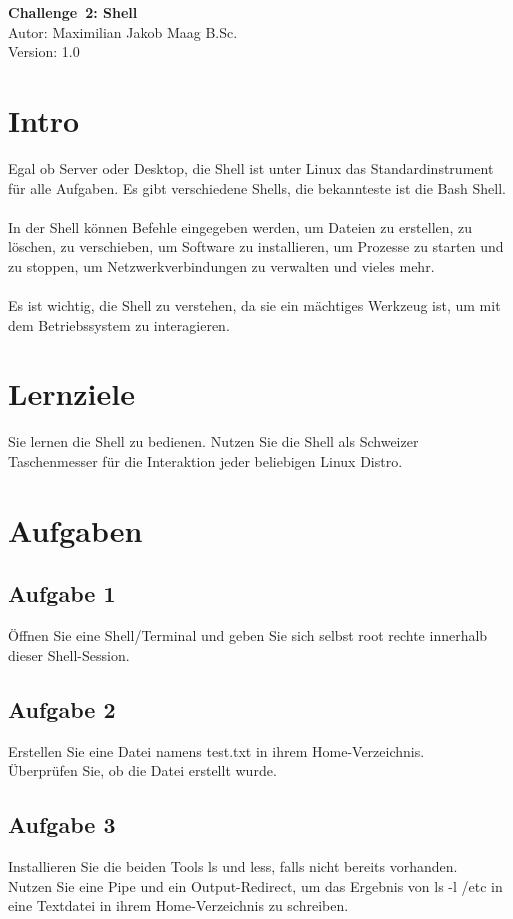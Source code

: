 \documentclass{article}
\begin{document}
    \begin{center}
        \Large \textbf{Challenge 2: Shell} \\ [6pt]
        \normalsize
        Autor: Maximilian Jakob Maag B.Sc. \\
        Version: 1.0
    \end{center}
    
    \section{Intro}
    Egal ob Server oder Desktop, die Shell ist unter Linux das Standardinstrument für
    alle Aufgaben. Es gibt verschiedene Shells, die bekannteste ist die Bash Shell. \\\\
    In der Shell können Befehle eingegeben werden, um Dateien zu erstellen, zu löschen, zu verschieben, um Software zu installieren, um Prozesse zu starten und zu stoppen, um Netzwerkverbindungen zu verwalten und vieles mehr. \\\\
    Es ist wichtig, die Shell zu verstehen, da sie ein mächtiges Werkzeug ist, um mit dem Betriebssystem zu interagieren.

    \section{Lernziele}
    Sie lernen die Shell zu bedienen. Nutzen Sie die Shell als Schweizer Taschenmesser für die Interaktion jeder beliebigen Linux Distro.

    \section{Aufgaben}
    \subsection{Aufgabe 1}
    Öffnen Sie eine Shell/Terminal und geben Sie sich selbst root rechte innerhalb dieser Shell-Session.

    \subsection{Aufgabe 2}
    Erstellen Sie eine Datei namens test.txt in ihrem Home-Verzeichnis. \\
    Überprüfen Sie, ob die Datei erstellt wurde.

    \subsection{Aufgabe 3}
    Installieren Sie die beiden Tools ls und less, falls nicht bereits vorhanden. \\
    Nutzen Sie eine Pipe und ein Output-Redirect, um das Ergebnis von ls -l /etc in eine Textdatei in ihrem Home-Verzeichnis zu schreiben.
\end{document}
